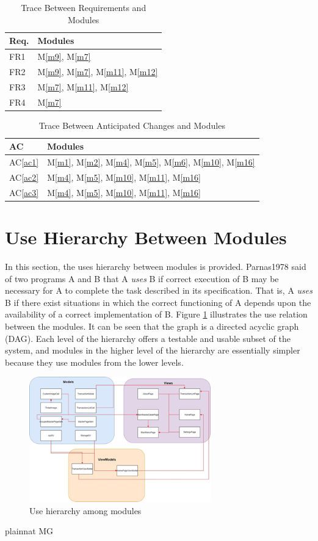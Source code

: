 \documentclass[12pt, titlepage]{article}
\newcommand{\acref}[1]{AC\ref{#1}}
\newcommand{\mref}[1]{M\ref{#1}}
\begin{document}
\begin{table}[H]
\centering
\begin{tabular}{p{} p{}}
\toprule
\textbf{Req.} & \textbf{Modules}\\
\midrule
FR1 & \mref{m9}, \mref{m7}\\
FR2 & \mref{m9}, \mref{m7}, \mref{m11}, \mref{m12}\\
FR3 & \mref{m7}, \mref{m11}, \mref{m12}\\
FR4 & \mref{m7}\\
\bottomrule
\end{tabular}
\caption{Trace Between Requirements and Modules}
\label{TblRT}
\end{table}

\begin{table}[H]
\centering
\begin{tabular}{p{} p{}}
\toprule
\textbf{AC} & \textbf{Modules}\\
\midrule
\acref{ac1} & \mref{m1}, \mref{m2}, \mref{m4}, \mref{m5}, \mref{m6}, \mref{m10}, \mref{m16}\\
\acref{ac2} & \mref{m4}, \mref{m5}, \mref{m10}, \mref{m11}, \mref{m16}\\
\acref{ac3} & \mref{m4}, \mref{m5}, \mref{m10}, \mref{m11}, \mref{m16}\\
\bottomrule
\end{tabular}
\caption{Trace Between Anticipated Changes and Modules}
\label{TblACT}
\end{table}

\section{Use Hierarchy Between Modules} \label{SecUse}

In this section, the uses hierarchy between modules is
provided. Parnas1978 said of two programs A and B that A {\em uses} B if
correct execution of B may be necessary for A to complete the task described in
its specification. That is, A {\em uses} B if there exist situations in which
the correct functioning of A depends upon the availability of a correct
implementation of B.  Figure \ref{FigUH} illustrates the use relation between
the modules. It can be seen that the graph is a directed acyclic graph
(DAG). Each level of the hierarchy offers a testable and usable subset of the
system, and modules in the higher level of the hierarchy are essentially simpler
because they use modules from the lower levels.

\begin{figure}[H]
\centering
\includegraphics[width=0.7\textwidth]{UsesHierarchy.png}
\caption{Use hierarchy among modules}
\label{FigUH}
\end{figure}


 {plainnat}
 {MG}
\end{document}
